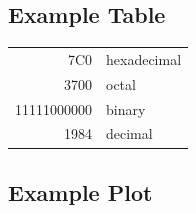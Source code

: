 \documentclass[%
  headings = standardclasses, %
]{tumDiss}
\begin{document}



\subsection{Example Table}


\begin{table}[thb]
    \renewcommand{\arraystretch}{1.3}
    \label{table:example_table}
    \centering

    \begin{tabular}{|r|l|}
      \hline
      7C0         & hexadecimal \\
      3700        & octal \\
      \cline{2-2}
      11111000000 & binary \\
      \hline
      \hline
      1984        & decimal \\
      \hline
    \end{tabular}
\end{table}


\lipsum[2-4]



\subsection{Example Plot}

\lipsum[1]
\end{document}
